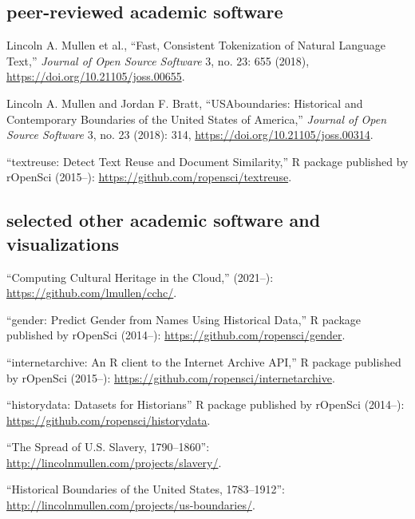 \documentclass[11pt]{article}
\begin{document}
\subsection{peer-reviewed academic software}\label{academic-software}

Lincoln A. Mullen et al., ``Fast, Consistent Tokenization of Natural Language 
Text,'' \emph{Journal of Open Source Software} 3, no. 23: 655 (2018), 
\url{https://doi.org/10.21105/joss.00655}.

Lincoln A. Mullen and Jordan F. Bratt, ``USAboundaries: Historical and 
Contemporary Boundaries of the United States of America,'' \emph{Journal of 
Open Source Software} 3, no. 23 (2018): 314, 
\url{https://doi.org/10.21105/joss.00314}.

``textreuse: Detect Text Reuse and Document Similarity,'' R package published 
by rOpenSci (2015--): 
\url{https://github.com/ropensci/textreuse}.

\subsection{selected other academic software and visualizations}\label{other-academic-software}

``Computing Cultural Heritage in the Cloud,'' (2021--): \url{https://github.com/lmullen/cchc/}.

``gender: Predict Gender from Names Using Historical Data,'' R package 
published by rOpenSci (2014--): \url{https://github.com/ropensci/gender}.

``internetarchive: An R client to the Internet Archive API,'' R package 
published by rOpenSci (2015--): 
\url{https://github.com/ropensci/internetarchive}.

``historydata: Datasets for Historians'' R package published by rOpenSci 
(2014--):  
\url{https://github.com/ropensci/historydata}.


``The Spread of U.S.  Slavery, 1790--1860'':  
\url{http://lincolnmullen.com/projects/slavery/}.

``Historical Boundaries of the United States, 1783--1912'': 
\url{http://lincolnmullen.com/projects/us-boundaries/}.


\end{document}
